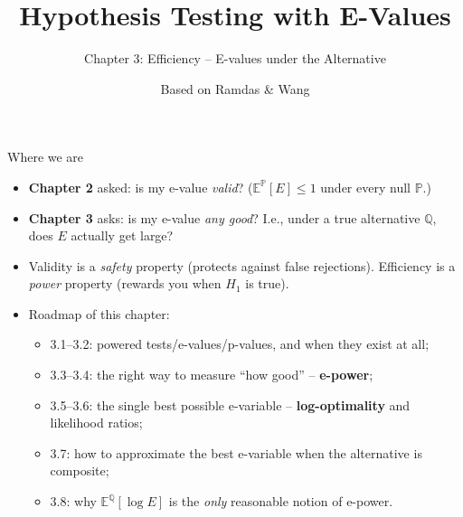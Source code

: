 \documentclass[aspectratio=169,10pt]{beamer}
\title[E-Values -- Ch.3]{Hypothesis Testing with E-Values}
\subtitle{Chapter 3: Efficiency -- E-values under the Alternative}
\author{Based on Ramdas \& Wang}
\date{}
\newcommand{\PP}{\mathbb{P}}
\newcommand{\QQ}{\mathbb{Q}}
\newcommand{\EE}{\mathbb{E}}
\begin{document}
\begin{frame}
  \titlepage
\end{frame}

\begin{frame}{Where we are}
  \begin{itemize}
    \item \textbf{Chapter 2} asked: is my e-value \emph{valid}? ($\EE^\PP[E]\le 1$ under every null $\PP$.)
    \item \textbf{Chapter 3} asks: is my e-value \emph{any good}? I.e., under a true alternative $\QQ$, does $E$ actually get large?
    \item Validity is a \emph{safety} property (protects against false rejections). Efficiency is a \emph{power} property (rewards you when $H_1$ is true).
    \item Roadmap of this chapter:
    \begin{itemize}
      \item 3.1--3.2: powered tests/e-values/p-values, and when they exist at all;
      \item 3.3--3.4: the right way to measure ``how good'' -- \textbf{e-power};
      \item 3.5--3.6: the single best possible e-variable -- \textbf{log-optimality} and likelihood ratios;
      \item 3.7: how to approximate the best e-variable when the alternative is composite;
      \item 3.8: why $\EE^\QQ[\log E]$ is the \emph{only} reasonable notion of e-power.
    \end{itemize}
  \end{itemize}
\end{frame}
\end{document}
